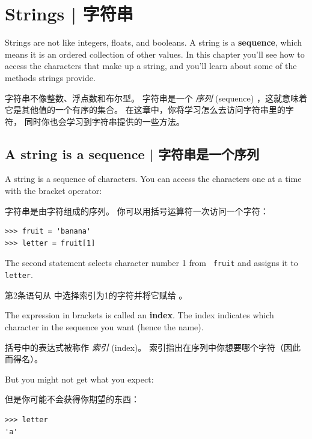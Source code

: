 

\chapter{Strings  |  字符串}
\label{strings}

Strings are not like integers, floats, and booleans.  A string
is a {\bf sequence}, which means it is
an ordered collection of other values.  In this chapter you'll see
how to access the characters that make up a string, and you'll
learn about some of the methods strings provide.

字符串不像整数、浮点数和布尔型。 字符串是一个 {\em 序列} (sequence) ，这就意味着
它是其他值的一个有序的集合。 在这章中，你将学习怎么去访问字符串里的字符， 同时你也会学习到字符串提供的一些方法。



\section{A string is a sequence  |  字符串是一个序列}

  
  

A string is a sequence of characters.
You can access the characters one at a time with the
bracket operator:

字符串是由字符组成的序列。 你可以用括号运算符一次访问一个字符：

\begin{lstlisting}
>>> fruit = 'banana'
>>> letter = fruit[1]
\end{lstlisting}

%
The second statement selects character number 1 from {\tt
fruit} and assigns it to {\tt letter}.

第2条语句从  中选择索引为1的字符并将它赋给  。

The expression in brackets is called an {\bf index}.
The index indicates which character in the sequence you
want (hence the name).

括号中的表达式被称作 {\em 索引} (index)。 索引指出在序列中你想要哪个字符（因此而得名）。

But you might not get what you expect:

但是你可能不会获得你期望的东西：

\begin{lstlisting}
>>> letter
'a'
\end{lstlisting}

